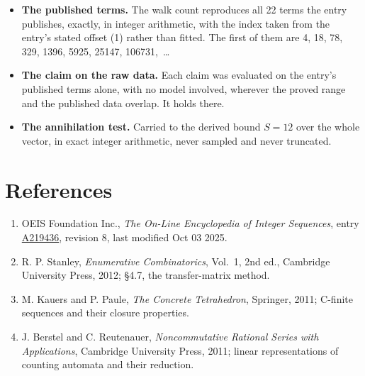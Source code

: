 \documentclass[11pt]{article}
\theoremstyle{definition}
\begin{document}
\begin{itemize}

\item {\bfseries The published terms.} The walk count reproduces all 22 terms the entry publishes, exactly, in integer arithmetic, with the index taken from the entry's stated offset (1) rather than fitted. The first of them are 4, 18, 78, 329, 1396, 5925, 25147, 106731,~\dots

\item {\bfseries The claim on the raw data.} Each claim was evaluated on the entry's published terms alone, with no model involved, wherever the proved range and the published data overlap. It holds there.

\item {\bfseries The annihilation test.} Carried to the derived bound $S = 12$ over the whole vector, in exact integer arithmetic, never sampled and never truncated.

\end{itemize}

\section{References}

\begin{enumerate}

\item OEIS Foundation Inc., \emph{The On-Line Encyclopedia of Integer Sequences}, entry \href{https://oeis.org/A219436}{A219436}, revision 8, last modified Oct 03 2025.

\item R. P. Stanley, \emph{Enumerative Combinatorics}, Vol.~1, 2nd ed., Cambridge University Press, 2012; \S4.7, the transfer-matrix method.

\item M. Kauers and P. Paule, \emph{The Concrete Tetrahedron}, Springer, 2011; C-finite sequences and their closure properties.

\item J. Berstel and C. Reutenauer, \emph{Noncommutative Rational Series with Applications}, Cambridge University Press, 2011; linear representations of counting automata and their reduction.

\end{enumerate}
\end{document}
